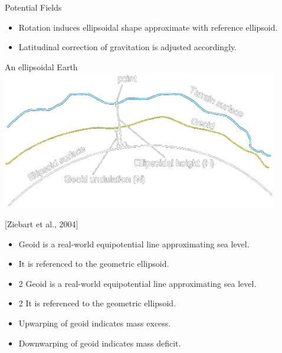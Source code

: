 \begin{frame}
\begin{PointSix}{Potential Fields}
  \begin{itemize}
    \item Rotation induces ellipsoidal shape approximate with reference ellipsoid.
    \item Latitudinal correction of gravitation is adjusted accordingly.
  \end{itemize}
\end{PointSix}
\end{frame}


\begin{frame}
  \begin{PointSix}{An ellipsoidal Earth}
      \includegraphics[width=0.9\textwidth]{Figures/Gravity/Exported/Geoid_Ziebart2004_TransparentBlack.png}

      \tiny [Ziebart et al., 2004] 

      \small
      {
        \begin{itemize}
          \item Geoid is a real-world equipotential line approximating sea level.
          \item It is referenced to the geometric ellipsoid.
        \end{itemize}
      }
      {
        \begin{itemize}
          \item 2 Geoid is a real-world equipotential line approximating sea level.
          \item 2 It is referenced to the geometric ellipsoid.
        \end{itemize}
      }
      {
        \begin{itemize}
          \item Upwarping of geoid indicates mass excess.
          \item Downwarping of geoid indicates mass deficit.
        \end{itemize}
      }
  \end{PointSix}
  \end{frame}
